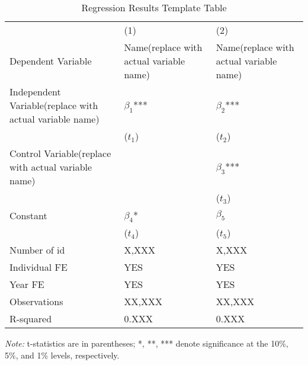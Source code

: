 \begin{table}[htbp]
\caption{Regression Results Template Table}
\label{Use the regression name as the label}
\centering
\begin{tabular}{p{3.6cm}p{3.6cm}p{3.6cm}} %
\toprule
& (1) & (2) \\
Dependent Variable  & Name(replace with actual variable name)  & Name(replace with actual variable name) \\
\midrule
Independent Variable(replace with actual variable name)  & $\beta_1$*** & $\beta_2$*** \\
            & ($t_1$) & ($t_2$) \\
Control Variable(replace with actual variable name)     &  & $\beta_3$*** \\  %
            &  & ($t_3$) \\
Constant    & $\beta_4$* & $\beta_5$ \\
            & ($t_4$) & ($t_5$) \\

Number of id       & X,XXX        & X,XXX \\
Individual FE      & YES          & YES \\
Year FE            & YES          & YES \\
Observations       & XX,XXX       & XX,XXX \\
R-squared          & 0.XXX        & 0.XXX \\
\bottomrule
\end{tabular}
\begin{tablenotes}
\small
\item \textit{Note:} t-statistics are in parentheses; *, **, *** denote significance at the 10\%, 5\%, and 1\% levels, respectively.
\end{tablenotes}
\end{table}


